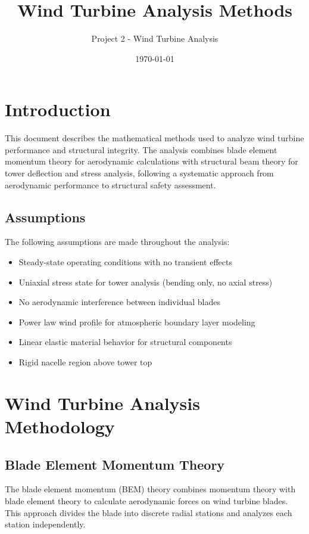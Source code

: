 \documentclass[11pt]{article}
\title{Wind Turbine Analysis Methods}
\author{Project 2 - Wind Turbine Analysis}
\date{\today}
\begin{document}
\maketitle

\section{Introduction}

This document describes the mathematical methods used to analyze wind turbine performance and structural integrity. The analysis combines blade element momentum theory for aerodynamic calculations with structural beam theory for tower deflection and stress analysis, following a systematic approach from aerodynamic performance to structural safety assessment.

\subsection{Assumptions}

The following assumptions are made throughout the analysis:
\begin{itemize}
    \item Steady-state operating conditions with no transient effects
    \item Uniaxial stress state for tower analysis (bending only, no axial stress)
    \item No aerodynamic interference between individual blades
    \item Power law wind profile for atmospheric boundary layer modeling
    \item Linear elastic material behavior for structural components
    \item Rigid nacelle region above tower top
\end{itemize}

\section{Wind Turbine Analysis Methodology}

\subsection{Blade Element Momentum Theory}

The blade element momentum (BEM) theory combines momentum theory with blade element theory to calculate aerodynamic forces on wind turbine blades. This approach divides the blade into discrete radial stations and analyzes each station independently.
\end{document}

